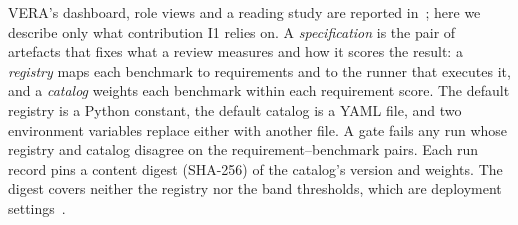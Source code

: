 
VERA's dashboard, role views and a reading study are reported in~\apsec; here we describe only what contribution I1 relies on.
A \emph{specification} is the pair of artefacts that fixes what a review measures and how it scores the result: a \emph{registry} maps each benchmark to requirements and to the runner that executes it, and a \emph{catalog} weights each benchmark within each requirement score.
The default registry is a Python constant, the default catalog is a YAML file, and two environment variables replace either with another file.
A gate fails any run whose registry and catalog disagree on the requirement--benchmark pairs.
Each run record pins a content digest (SHA-256) of the catalog's version and weights.
The digest covers neither the registry nor the band thresholds, which are deployment settings~.



